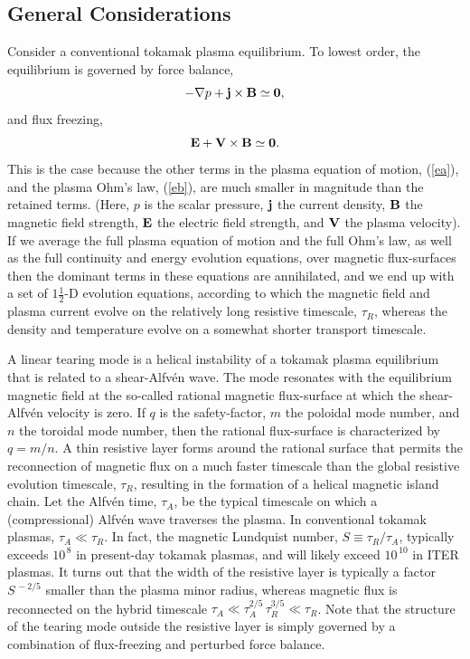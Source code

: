 \documentclass[12pt,prb,aps]{revtex4-1}
\begin{document}
\subsection{General Considerations}\label{general}
Consider a conventional tokamak plasma equilibrium. To lowest order, the equilibrium is governed by force balance,
\begin{equation}\label{ea}
-\nabla p + {\bf j}\times {\bf B} \simeq {\bf 0},
\end{equation}
and
flux freezing,
\begin{equation}\label{eb}
{\bf E} + {\bf V}\times {\bf B} \simeq {\bf 0}.
\end{equation}
This is the case because the other terms in the plasma equation of motion,
(\ref{ea}), and the plasma Ohm's law, (\ref{eb}), are much
smaller in magnitude than the retained terms. (Here, $p$ is the
scalar pressure, ${\bf j}$ the current density, ${\bf B}$ the
magnetic field strength, ${\bf E}$ the electric field strength, and ${\bf V}$ the plasma velocity). If we average the full plasma equation of motion and the full Ohm's law, as well as the full continuity and energy evolution equations, over magnetic flux-surfaces
then the dominant terms in these equations are annihilated, and
we end up with a set of $1\tfrac{1}{2}$-D evolution equations,
according to which the magnetic field and plasma current
evolve on the relatively long resistive timescale, $\tau_R$,
whereas the density and temperature evolve on a somewhat
shorter transport timescale.\cite{transp,gim}

A linear tearing mode is a helical instability of a tokamak plasma equilibrium that is related to a shear-Alfv\'{e}n wave.\cite{haz} The mode resonates with the equilibrium magnetic field at
the so-called rational magnetic flux-surface at which the
shear-Alfv\'{e}n velocity is zero. If $q$ is the safety-factor, $m$ the poloidal mode number, and $n$ the
toroidal mode number, then the rational
flux-surface is characterized by $q=m/n$. A thin resistive layer forms
around the rational surface that permits the reconnection of magnetic flux on a much faster timescale than the global
resistive evolution timescale, $\tau_R$, resulting in the formation of a helical magnetic island chain. Let the Alfv\'{e}n time,
$\tau_A$, be the
typical timescale on which a (compressional) Alfv\'{e}n
wave traverses the plasma.
In conventional tokamak plasmas, $\tau_A\ll \tau_R$. In fact,
the magnetic Lundquist number, $S\equiv \tau_R/\tau_A$,  typically exceeds $10^{\,8}$ in present-day tokamak plasmas,
and will likely exceed $10^{\,10}$ in ITER plasmas.
 It turns out that the width of the resistive layer is typically a factor $S^{\,-2/5}$ smaller than the
plasma minor radius, whereas magnetic flux is reconnected on
the hybrid timescale $\tau_A\ll \tau_A^{2/5}\,\tau_R^{3/5}\ll \tau_R$.\cite{fkr} Note that  the
structure of the tearing mode  outside the resistive layer is simply governed by a combination of flux-freezing and perturbed force balance. 
\end{document}
